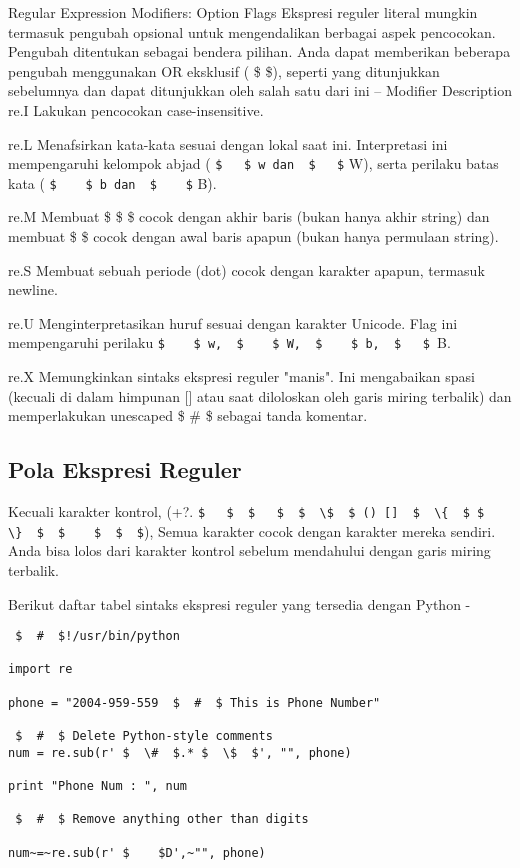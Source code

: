 \begin {enumerate}
\begin {enumerate}
Regular Expression Modifiers: Option Flags
Ekspresi reguler literal mungkin termasuk pengubah opsional untuk mengendalikan berbagai aspek pencocokan. Pengubah ditentukan sebagai bendera pilihan. Anda dapat memberikan beberapa pengubah menggunakan OR eksklusif ( \$   \$), seperti yang ditunjukkan sebelumnya dan dapat ditunjukkan oleh salah satu dari ini – Modifier Description
re.I
Lakukan pencocokan case-insensitive.

re.L
Menafsirkan kata-kata sesuai dengan lokal saat ini. Interpretasi ini mempengaruhi kelompok abjad ( \verb|$   $ w dan  $   $| W), serta perilaku batas kata ( \verb|$    $ b dan  $    $| B).

re.M
Membuat  \$  \$  \$ cocok dengan akhir baris (bukan hanya akhir string) dan membuat  \$   \$ cocok dengan awal baris apapun (bukan hanya permulaan string).

re.S
Membuat sebuah periode (dot) cocok dengan karakter apapun, termasuk newline.

re.U
Menginterpretasikan huruf sesuai dengan karakter Unicode. Flag ini mempengaruhi perilaku  \verb|$    $ w,  $    $ W,  $    $ b,  $   $ |B.

re.X
Memungkinkan sintaks ekspresi reguler "manis". Ini mengabaikan spasi (kecuali di dalam himpunan [] atau saat diloloskan oleh garis miring terbalik) dan memperlakukan unescaped  \$  \#  \$ sebagai tanda komentar.

\subsection{Pola Ekspresi Reguler}
Kecuali karakter kontrol, (+?.  \verb|$   $  $   $  $  \$  $ () []  $  \{  $ $  \}  $  $    $  $  $|), Semua karakter cocok dengan karakter mereka sendiri. Anda bisa lolos dari karakter kontrol sebelum mendahului dengan garis miring terbalik.

Berikut daftar tabel sintaks ekspresi reguler yang tersedia dengan Python -
\begin{verbatim}
 $  #  $!/usr/bin/python

import re

phone = "2004-959-559  $  #  $ This is Phone Number"

 $  #  $ Delete Python-style comments
num = re.sub(r' $  \#  $.* $  \$  $', "", phone)

print "Phone Num : ", num

 $  #  $ Remove anything other than digits

num~=~re.sub(r' $    $D',~"", phone)


\end{verbatim}
\end{enumerate}
\end{enumerate}
